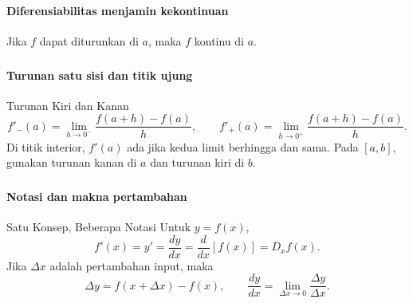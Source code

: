 \documentclass{../../kalkulus-ppt}
\begin{document}
\begin{frame}
\frametitle{\insertsection}
\framesubtitle{Diferensiabilitas menjamin kekontinuan}

\begin{teorema}
Jika $f$ dapat diturunkan di $a$, maka $f$ kontinu di $a$.
\end{teorema}
\end{frame}


\begin{frame}
\frametitle{\insertsection}
\framesubtitle{Turunan satu sisi dan titik ujung}

\begin{block}{Turunan Kiri dan Kanan}
\[f'_-(a)=\lim_{h\to0^-}\frac{f(a+h)-f(a)}h,\qquad
f'_+(a)=\lim_{h\to0^+}\frac{f(a+h)-f(a)}h.\]
Di titik interior, $f'(a)$ ada jika kedua limit berhingga dan sama.
Pada $[a,b]$, gunakan turunan kanan di $a$ dan turunan kiri di $b$.
\end{block}
\end{frame}


\begin{frame}
\frametitle{\insertsection}
\framesubtitle{Notasi dan makna pertambahan}

\begin{block}{Satu Konsep, Beberapa Notasi}
Untuk $y=f(x)$,
\[f'(x)=y'=\frac{dy}{dx}=\frac{d}{dx}[f(x)]=D_xf(x).\]
Jika $\Delta x$ adalah pertambahan input, maka
\[\Delta y=f(x+\Delta x)-f(x),\qquad
\frac{dy}{dx}=\lim_{\Delta x\to0}\frac{\Delta y}{\Delta x}.\]
\end{block}
\end{frame}
\end{document}
